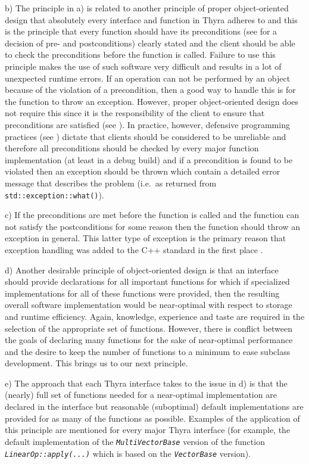 \documentclass[pdf,ps2pdf,11pt]{SANDreport}
\begin{document}
b) The principle in a) is related to another principle of proper
object-oriented design that absolutely every interface and function in
Thyra adheres to and this is the principle that every function should
have its preconditions (see {}\cite{ref:uml_distilled_2nd_ed} for a
decision of pre- and postconditions) clearly stated and the client
should be able to check the preconditions before the function is called.
Failure to use this principle makes the use of such software very
difficult and results in a lot of unexpected runtime errors.  If an
operation can not be performed by an object because of the violation
of a precondition, then a good way to handle this is for the function to
throw an exception.  However, proper object-oriented design does not
require this since it is the responsibility of the client to ensure
that preconditions are satisfied (see
{}\cite{ref:uml_distilled_2nd_ed}).  In practice, however, defensive
programming practices (see {}\cite{ref:stroustrup_1997}) dictate that
clients should be considered to be unreliable and therefore all
preconditions should be checked by every major function implementation
(at least in a debug build) and if a precondition is found to be
violated then an exception should be thrown which contain a detailed
error message that describes the problem (i.e.~as returned from
{}\texttt{std::exception::what()}).

c) If the preconditions are met before the function is called and the
function can not satisfy the postconditions for some reason then the
function should throw an exception in general.  This latter type of
exception is the primary reason that exception handling was added to
the C++ standard in the first place {}\cite{ref:design_evol_cpp}.

d) Another desirable principle of object-oriented design is that an
interface should provide declarations for all important functions for
which if specialized implementations for all of these functions were
provided, then the resulting overall software implementation would be
near-optimal with respect to storage and runtime efficiency.  Again,
knowledge, experience and taste are required in the selection of the
appropriate set of functions.  However, there is conflict between the
goals of declaring many functions for the sake of near-optimal
performance and the desire to keep the number of functions to a minimum
to ease subclass development.  This brings us to our next principle.

e) The approach that each Thyra interface takes to the issue in d)
is that the (nearly) full set of functions needed for a near-optimal
implementation are declared in the interface but reasonable
(suboptimal) default implementations are provided for as many of the
functions as possible.  Examples of the application of this principle
are mentioned for every major Thyra interface (for example, the
default implementation of the {}\texttt{\textit{Multi\-Vector\-Base}}
version of the function {}\texttt{\textit{LinearOp\-::apply(\-...)}}
which is based on the {}\texttt{\textit{Vector\-Base}} version).
\end{document}
